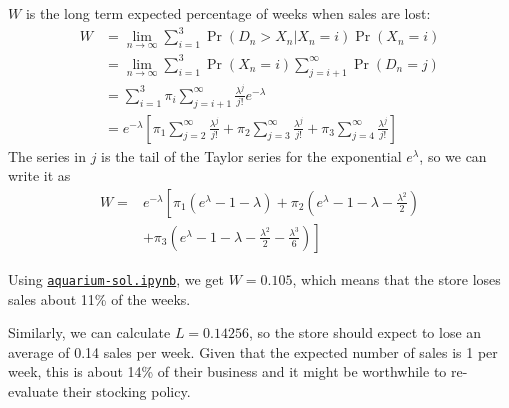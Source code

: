 \begin{solution}
\begin{slide}
\begin{parts}
	\item $W$ is the long term expected percentage of weeks when sales are lost:\\[-20pt]
	\begin{align*}
		W 	
			& = \lim_{n \to \infty} \sum_{i=1}^3 \Pr(D_n>X_n | X_n = i) \Pr (X_n = i) \\
			& = \lim_{n \to \infty} \sum_{i=1}^3 \Pr (X_n = i) \sum_{j=i+1}^\infty \Pr(D_n=j)\\
			& = \sum_{i=1}^3 \pi_i \sum_{j=i+1}^\infty \frac{\lambda^j}{j!} e^{-\lambda} \\
			& = e^{-\lambda} \left[ \pi_1 \sum_{j=2}^\infty \frac{\lambda^j}{j!} + \pi_2  \sum_{j=3}^\infty \frac{\lambda^j}{j!} + \pi_3  \sum_{j=4}^\infty \frac{\lambda^j}{j!} \right]
	\end{align*}
	The series in $j$ is the tail of the Taylor series for the exponential $e^{\lambda}$, so we can write it as \\[-15pt]
	\begin{align*}
	W = & e^{-\lambda}  \left[ \pi_1 ( e^\lambda - 1 - \lambda ) + \pi_2 ( e^\lambda - 1 - \lambda - {\textstyle \frac{\lambda^2}{2}}) \right.\\ 
		& \left.+ \pi_3 ( e^\lambda - 1 - \lambda - {\textstyle \frac{\lambda^2}{2}- \frac{\lambda^3}{6}}) \right]
	\end{align*}


	Using \href{https://utoronto.syzygy.ca/jupyter/user-redirect/git-pull?repo=https://github.com/bigfatbernie/IBLMathModeling&subPath=book/python/aquarium-sol.ipynb}{\tt aquarium-sol.ipynb}, we get $W = 0.105$, which means that the store loses sales about 11\% of the weeks.
	
\end{parts}


\end{slide}


\begin{slide}
\begin{parts}
\setcounter{partsitem}{10}
	\item Similarly, we can calculate $L =  0.14256$, so the store should expect to lose an average of 0.14 sales per week. 
	Given that the expected number of sales is 1 per week, this is about 14\% of their business and it might be worthwhile to re-evaluate their stocking policy. 
	

\end{parts}
\end{slide}
\end{solution}
